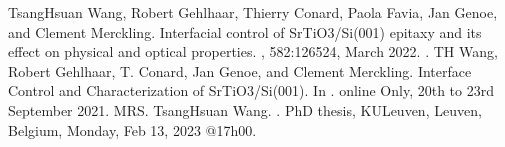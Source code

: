 \documentclass[a4paper,10pt,english,openany,oneside]{jupyterBook}
\begin{document}
\begin{sphinxthebibliography}{1}
\sphinxAtStartPar
Tsang\sphinxhyphen{}Hsuan Wang, Robert Gehlhaar, Thierry Conard, Paola Favia, Jan Genoe, and Clement Merckling. Interfacial control of SrTiO3/Si(001) epitaxy and its effect on physical and optical properties. , 582:126524, March 2022. .
\sphinxAtStartPar
T\sphinxhyphen{}H Wang, Robert Gehlhaar, T. Conard, Jan Genoe, and Clement Merckling. Interface Control and Characterization of SrTiO3/Si(001). In . online Only, 20th to 23rd September 2021. MRS.
\sphinxAtStartPar
Tsang\sphinxhyphen{}Hsuan Wang. . PhD thesis, KULeuven, Leuven, Belgium, Monday, Feb 13, 2023 @17h00.
\end{sphinxthebibliography}







\renewcommand{\indexname}{Index}
\printindex
\end{document}
